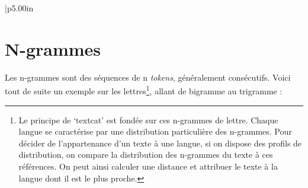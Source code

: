 \documentclass[
]{book}
\newenvironment{Shaded}{\begin{snugshade}}{\end{snugshade}}
\newcommand{\DataTypeTok}[1]{\textcolor[rgb]{0.13,0.29,0.53}{#1}}
\newcommand{\DecValTok}[1]{\textcolor[rgb]{0.00,0.00,0.81}{#1}}
\newcommand{\KeywordTok}[1]{\textcolor[rgb]{0.13,0.29,0.53}{\textbf{#1}}}
\newcommand{\NormalTok}[1]{#1}
\newcommand{\OperatorTok}[1]{\textcolor[rgb]{0.81,0.36,0.00}{\textbf{#1}}}
\newcommand{\StringTok}[1]{\textcolor[rgb]{0.31,0.60,0.02}{#1}}
\begin{document}
\begin{longtable}[c]{|p{5.00in}}
 \\

\noalign{\global\setlength{\arrayrulewidth}{2pt}}

\end{longtable}

\hypertarget{n-grammes}{%
\section{N-grammes}\label{n-grammes}}

Les n-grammes sont des séquences de n \emph{tokens}, généralement consécutifs. Voici tout de suite un exemple sur les lettres\footnote{Le principe de `textcat' est fondée sur ces n-grammes de lettre. Chaque langue se caractérise par une distribution particulière des n-grammes. Pour décider de l'appartenance d'un texte à une langue, si on dispose des profils de distribution, on compare la distribution des n-grammes du texte à ces références. On peut ainsi calculer une distance et attribuer le texte à la langue dont il est le plus proche.}, allant de bigramme au trigramme :

\begin{Shaded}
\end{Shaded}

\providecommand{\docline}[3]{\noalign{\global\setlength{\arrayrulewidth}{#1}}\arrayrulecolor[HTML]{#2}\cline{#3}}

\setlength{\tabcolsep}{2pt}

\renewcommand*{\arraystretch}{1.5}
\end{document}
